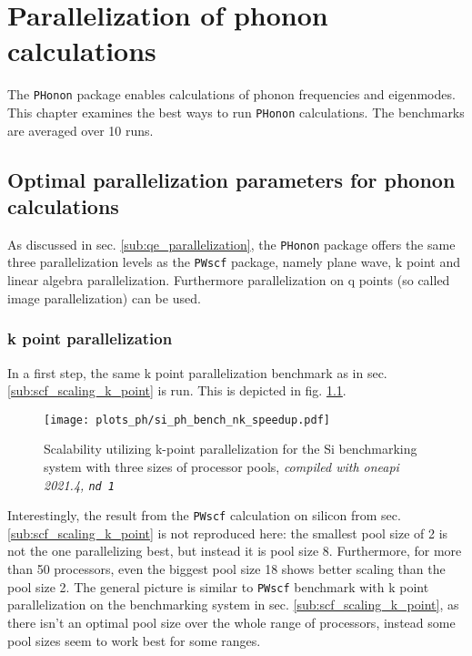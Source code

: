 \documentclass[main.tex]{subfiles}
\begin{document}
\chapter{Parallelization of phonon calculations}\label{ch:optimization_ph}

The \texttt{PHonon} package enables calculations of phonon frequencies and eigenmodes.
This chapter examines the best ways to run \texttt{PHonon} calculations.
The benchmarks are averaged over 10 runs.

\section{Optimal parallelization parameters for phonon calculations}

As discussed in sec. \ref{sub:qe_parallelization}, the \texttt{PHonon} package offers the same three parallelization levels as the \texttt{PWscf} package, namely plane wave, k point and linear algebra parallelization.
Furthermore parallelization on q points (so called image parallelization) can be used.

\subsection{k point parallelization}

In a first step, the same k point parallelization benchmark as in sec. \ref{sub:scf_scaling_k_point} is run. This is depicted in fig. \ref{fig:scaling_ph_nk_si}.

\begin{figure}[htb!]
    \centering
    \texttt{[image: plots\_ph/si\_ph\_bench\_nk\_speedup.pdf]}
    \caption{Scalability utilizing k-point parallelization for the Si benchmarking system with three sizes of processor pools, \emph{\QE compiled with \gls{oneapi} 2021.4, \texttt{nd 1}}}
    \label{fig:scaling_ph_nk_si}
\end{figure}
Interestingly, the result from the \texttt{PWscf} calculation on silicon from sec. \ref{sub:scf_scaling_k_point} is not reproduced here: the smallest pool size of 2 is not the one parallelizing best, but instead it is pool size 8.
Furthermore, for more than 50 processors, even the biggest pool size 18 shows better scaling than the pool size 2.
The general picture is similar to \texttt{PWscf} benchmark with k point parallelization on the \TaS benchmarking system in sec. \ref{sub:scf_scaling_k_point}, as there isn't an optimal pool size over the whole range of processors, instead some pool sizes seem to work best for some ranges.
\end{document}
